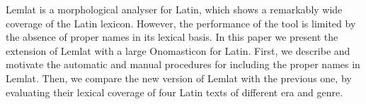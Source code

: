 Lemlat is a morphological analyser for Latin, which shows a remarkably wide coverage of the Latin lexicon. However, the performance of the tool is limited by the absence of proper names in its lexical basis. In this paper we present the extension of Lemlat with a large Onomasticon for Latin. First, we describe and motivate the automatic and manual procedures for including the proper names in Lemlat. Then, we compare the new version of Lemlat with the previous one, by evaluating their lexical coverage of four Latin texts of different era and genre.
